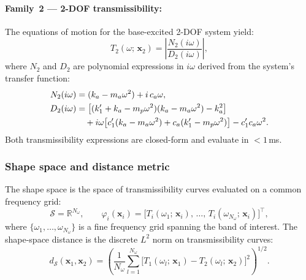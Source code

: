 \paragraph{Family~2 --- 2-DOF transmissibility:}
The equations of motion for the base-excited 2-DOF system yield:
\begin{equation}
    T_2(\omega;\, \mathbf{x}_2)
    = \left| \frac{N_2(i\omega)}{D_2(i\omega)} \right|,
    \label{eq:dva_transmissibility}
\end{equation}
where $N_2$ and $D_2$ are polynomial expressions in $i\omega$ derived from the system's transfer function:
\begin{subequations}
\label{eq:dva_transfer}
\begin{align}
    N_2(i\omega) &= (k_a - m_a \omega^2) + i\, c_a \omega, \\
    D_2(i\omega) &= \bigl[(k_1' + k_a - m_p \omega^2)(k_a - m_a \omega^2)
                    - k_a^2\bigr] \notag \\
                 &\quad + i\omega \bigl[c_1'(k_a - m_a \omega^2) + c_a(k_1' - m_p \omega^2)\bigr]
                    - c_1' c_a \omega^2.
\end{align}
\end{subequations}
Both transmissibility expressions are closed-form and evaluate in $< 1$\,ms.


\subsubsection{Shape space and distance metric}

The shape space is the space of transmissibility curves evaluated on a common frequency grid:
\begin{equation}
    \mathcal{S} = \mathbb{R}^{N_\omega}, \qquad
    \varphi_i(\mathbf{x}_i) = \bigl[T_i(\omega_1;\, \mathbf{x}_i),\, \ldots,\, T_i(\omega_{N_\omega};\, \mathbf{x}_i)\bigr]^\top,
    \label{eq:vibration_shape_space}
\end{equation}
where $\{\omega_1, \ldots, \omega_{N_\omega}\}$ is a fine frequency grid spanning the band of interest. The shape-space distance is the discrete $L^2$ norm on transmissibility curves:
\begin{equation}
    d_{\mathcal{S}}(\mathbf{x}_1, \mathbf{x}_2)
    = \left( \frac{1}{N_\omega} \sum_{l=1}^{N_\omega}
    \bigl[ T_1(\omega_l;\, \mathbf{x}_1) - T_2(\omega_l;\, \mathbf{x}_2) \bigr]^2 \right)^{1/2}.
    \label{eq:vibration_distance}
\end{equation}

